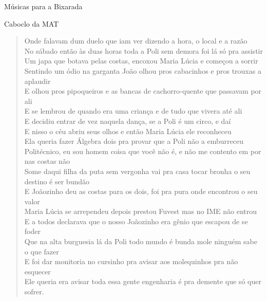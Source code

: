 \begin{secao}{Músicas para a Bixarada}
\begin{subsecao}{Caboclo da MAT}
\begin{verse}
Onde falavam dum duelo que iam ver dizendo a hora, o local e a razão\\
No sábado então às duas horas toda a Poli sem demora foi lá só pra assistir\\
Um japa que botava pelas costas, encoxou Maria Lúcia e começou a sorrir\\
Sentindo um ódio na garganta João olhou pros cabacinhos e pros trouxas a
aplaudir\\
E olhou pros pipoqueiros e as bancas de cachorro-quente que passavam por ali\\
E se lembrou de quando era uma criança e de tudo que vivera até ali\\
E decidiu entrar de vez naquela dança, se a Poli é um circo, e daí\\
E nisso o céu abriu seus olhos e então Maria Lúcia ele reconheceu\\
Ela queria fazer Álgebra dois pra provar que a Poli não a emburreceu\\
Politécnico, eu sou homem coisa que você não é, e não me contento em por nas
costas não\\
Some daqui filha da puta sem vergonha vai pra casa tocar bronha o seu destino é
ser bundão\\
E Joãozinho deu as costas para os dois, foi pra pura onde encontrou o seu valor\\
Maria Lúcia se arrependeu depois prestou Fuvest mas no IME não entrou\\
E a todos declarava que o nosso Joãozinho era gênio que escapou de se foder\\
Que na alta burguesia lá da Poli todo mundo é bunda mole ninguém sabe o que
fazer\\
E foi dar monitoria no cursinho pra avisar aos molequinhos pra não esquecer\\
Ele queria era avisar toda essa gente engenharia é pra demente que só quer
sofrer.\\
\end{verse}
\end{subsecao}

\end{secao}

